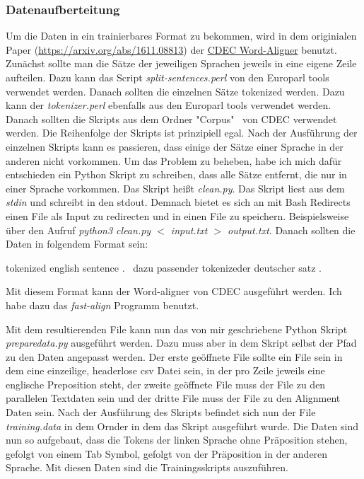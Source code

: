 \documentclass[10pt,a4paper]{article}
\begin{document}
\subsubsection{Datenaufberteitung}
\begin{flushleft}
Um die Daten in ein trainierbares Format zu bekommen, wird in dem originialen Paper (\url{https://arxiv.org/abs/1611.08813}) der \href{https://github.com/redpony/cdec}{CDEC Word-Aligner} benutzt. Zunächst sollte man die Sätze der jeweiligen Sprachen jeweils in eine eigene Zeile aufteilen. Dazu kann das Script \emph{split-sentences.perl} von den Europarl tools verwendet werden. Danach sollten die einzelnen Sätze tokenized werden. Dazu kann der \emph{tokenizer.perl} ebenfalls aus den Europarl tools verwendet werden.
Danach sollten die Skripts aus dem Ordner "Corpus" \ von CDEC verwendet werden. Die Reihenfolge der Skripts ist prinzipiell egal. Nach der Ausführung der einzelnen Skripts kann es passieren, dass einige der Sätze einer Sprache in der anderen nicht vorkommen. Um das Problem zu beheben, habe ich mich dafür entschieden ein Python Skript zu schreiben, dass alle Sätze entfernt, die nur in einer Sprache vorkommen. Das Skript heißt \emph{clean.py}. Das Skript liest aus dem \emph{stdin} und schreibt in den {stdout}. Demnach bietet es sich an mit Bash Redirects einen File als Input zu redirecten und in einen File zu speichern. Beispielsweise über den Aufruf \newline
\emph{python3 clean.py $<$ input.txt $>$ output.txt}. \newline
Danach sollten die Daten in folgendem Format sein:

tokenized english sentence . \textbar \textbar \textbar \  dazu passender tokenizeder deutscher satz .

Mit diesem Format kann der Word-aligner von CDEC ausgeführt werden. Ich habe dazu das \emph{fast-align} Programm benutzt.

Mit dem resultierenden File kann nun das von mir geschriebene Python Skript \emph{preparedata.py} ausgeführt werden. Dazu muss aber in dem Skript selbst der Pfad zu den Daten angepasst werden. Der erste geöffnete File sollte ein File sein in dem eine einzeilige, headerlose csv Datei sein, in der pro Zeile jeweils eine englische Preposition steht, der zweite geöffnete File muss der File zu den parallelen Textdaten sein und der dritte File muss der File zu den Alignment Daten sein. Nach der Ausführung des Skripts befindet sich nun der File \emph{training.data} in dem Ornder in dem das Skript ausgeführt wurde. Die Daten sind nun so aufgebaut, dass die Tokens der linken Sprache ohne Präposition stehen, gefolgt von einem Tab Symbol, gefolgt von der Präposition in der anderen Sprache. Mit diesen Daten sind die Trainingsskripts auszuführen.
\end{flushleft}
\end{document}
